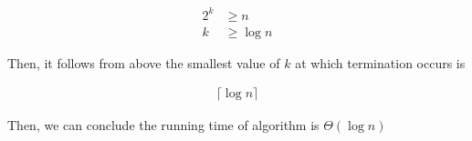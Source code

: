 \documentclass[12pt]{article}
\begin{document}
\begin{enumerate}[a.]
    \begin{align}
        2^k &\geq n\\
        k &\geq \log n
    \end{align}

    \bigskip

    Then, it follows from above the smallest value of $k$ at which termination occurs
    is

    \begin{align}
        \lceil \log n \rceil
    \end{align}

    \bigskip

    Then, we can conclude the running time of algorithm is $\Theta (\log n)$


\end{enumerate}
\end{document}

